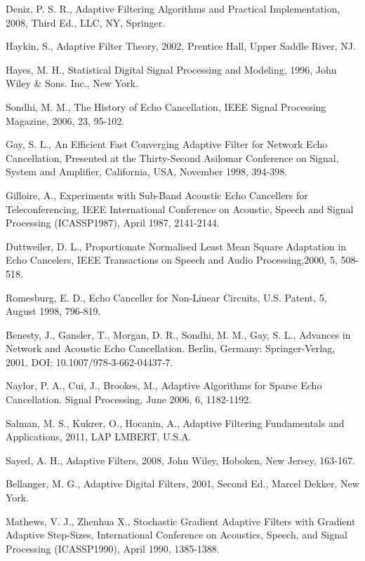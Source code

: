 Deniz, P. S. R., Adaptive Filtering Algorithms and Practical Implementation,  2008, Third Ed., LLC, NY, Springer.

Haykin, S., Adaptive Filter Theory, 2002, Prentice Hall, Upper Saddle River, NJ.

%
Hayes, M. H., Statistical Digital Signal Processing and Modeling, 1996, John Wiley \& Sons. Inc., New York.

Sondhi, M. M., The History of Echo Cancellation, IEEE Signal Processing Magazine,  2006, 23, 95-102.

Gay, S. L., An Efficient Fast Converging Adaptive Filter for Network Echo Cancellation, Presented at the Thirty-Second Asilomar Conference on Signal, System and Amplifier, California, USA, November 1998, 394-398.

Gilloire, A., Experiments with Sub-Band Acoustic Echo Cancellers for Teleconferencing, IEEE International Conference on  Acoustic, Speech and Signal Processing (ICASSP1987), April 1987, 2141-2144.

Duttweiler, D. L., Proportionate Normalised Least Mean Square Adaptation in Echo Cancelers, IEEE Transactions on Speech and Audio Processing,2000, 5, 508-518.

%
Romesburg, E. D., Echo Canceller for Non-Linear Circuits, U.S. Patent, 5, August 1998, 796-819.


Benesty, J., Gansler, T., Morgan, D. R., Sondhi, M. M., Gay, S. L., Advances in Network and Acoustic Echo Cancellation. Berlin, Germany: Springer-Verlag, 2001. DOI: 10.1007/978-3-662-04437-7.

Naylor, P. A., Cui, J., Brookes, M., Adaptive Algorithms for Sparse Echo Cancellation. Signal Processing, June 2006, 6, 1182-1192.



 Salman, M. S., Kukrer, O., Hocanin, A., Adaptive Filtering Fundamentals and Applications, 2011, LAP LMBERT, U.S.A.

Sayed, A. H., Adaptive Filters, 2008, John Wiley, Hoboken, New Jersey, 163-167.

Bellanger, M. G., Adaptive Digital Filters, 2001, Second Ed., Marcel Dekker, New York.

%
Mathews, V. J., Zhenhua X., Stochastic Gradient Adaptive Filters with Gradient Adaptive Step-Sizes, International Conference on Acoustics, Speech, and Signal Processing (ICASSP1990), April 1990, 1385-1388.

